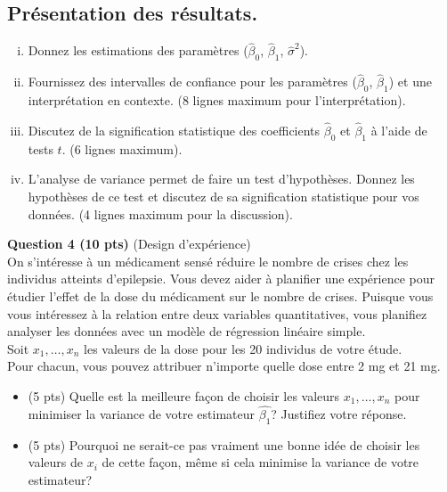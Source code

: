 \begin{questions}
\begin{parts}
	\part[17] {\bf Présentation des résultats.}
\begin{enumerate}[(i)]
	\item Donnez les estimations des param\`etres (${\hat \beta}_0$, ${\hat \beta}_1$, ${\hat \sigma}^2$).
	\item Fournissez des intervalles de confiance pour les paramètres (${\hat \beta}_0$, ${\hat \beta}_1$) et une interprétation en contexte. (8 lignes maximum pour l'interprétation).
	\item Discutez de la signification statistique des coefficients ${\hat \beta}_0$ et ${\hat \beta}_1$ à l'aide de tests $t$. (6 lignes maximum).
	\item L'analyse de variance permet de faire un test d'hypothèses. Donnez les hypothèses de ce test et discutez de sa signification statistique pour vos données. (4 lignes maximum pour la discussion).
\end{enumerate}
\end{parts}

\end{questions}







\vspace{0.3in}
\textbf{Question 4 (10 pts)} (Design d'expérience)\\

On s'intéresse à un médicament sensé réduire le nombre de crises chez les individus atteints d'epilepsie. Vous devez aider à planifier une expérience pour étudier l'effet de la dose du médicament sur le nombre de crises. Puisque vous vous intéressez à la relation entre deux variables quantitatives, vous planifiez analyser les données avec un modèle de régression linéaire simple. \\

Soit $x_1, \ldots, x_n$ les valeurs de la dose pour les 20 individus de votre étude.\\ Pour chacun, vous pouvez attribuer n'importe quelle dose entre 2 mg et 21 mg. \\

\begin{itemize}
\item [(a)] (5 pts) Quelle est la meilleure fa\c{c}on de choisir les valeurs $x_1,\ldots,x_n$ pour minimiser la variance de votre estimateur $\hat{\beta_1}$? Justifiez votre réponse.
\vspace{0.1 in}
\item [(b)] (5 pts) Pourquoi ne serait-ce pas vraiment une bonne idée de choisir les valeurs de $x_i$ de cette façon, même si cela minimise la variance de votre estimateur?
\end{itemize}

 